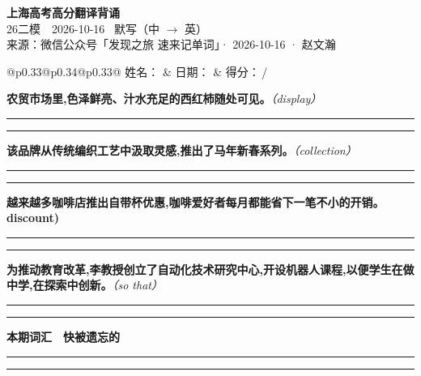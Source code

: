 \documentclass[11pt,a4paper]{article}
\newcommand{\num}[1]{\makebox[1.9em][r]{#1.}\hspace{0.3em}}
\newcommand{\wline}{\noindent\rule{\linewidth}{0.4pt}}
\newcommand{\prompt}[1]{\emph{\textcolor{tipblue}{\small（#1）}}}
\begin{document}
\pagestyle{plain}
\begin{center}
{\LARGE\bfseries 上海高考高分翻译背诵 }\\[0.25em]
{\large 26二模　2026-10-16 \quad\ 默写（中 $\to$ 英）}\\[0.35em]
{\footnotesize 来源：微信公众号「发现之旅 速来记单词」· 2026-10-16 · 赵文瀚}
\end{center}

\vspace{0.4em}
\noindent\begin{tabular}{@{}p{0.33\textwidth}@{}p{0.34\textwidth}@{}p{0.33\textwidth}@{}}
姓名：\underline{\hspace{2.0cm}} & 日期：\underline{\hspace{2.0cm}} & 得分：\underline{\hspace{1.4cm}}\,/ \\
\end{tabular}

\vspace{0.5em}

\vspace{0.8em}
\num{1}\textbf{农贸市场里,色泽鲜亮、汁水充足的西红柿随处可见。}\prompt{display}

\vspace{0.3em}

\wline\vspace{0.3em}
\wline

\num{2}\textbf{该品牌从传统编织工艺中汲取灵感,推出了马年新春系列。}\prompt{collection}

\vspace{0.3em}

\wline\vspace{0.3em}
\wline

\num{3}\textbf{越来越多咖啡店推出自带杯优惠,咖啡爱好者每月都能省下一笔不小的开销。discount)}

\vspace{0.3em}

\wline\vspace{0.3em}
\wline

\num{4}\textbf{为推动教育改革,李教授创立了自动化技术研究中心,开设机器人课程,以便学生在做中学,在探索中创新。}\prompt{so that}

\vspace{0.3em}

\wline\vspace{0.3em}
\wline

\vspace{0.4em}\noindent{\color{rulegray}\rule{\textwidth}{0.6pt}}\vspace{0.4em}

\num{5}\textbf{本期词汇　快被遗忘的}

\vspace{0.3em}

\wline\vspace{0.3em}
\wline
\end{document}
